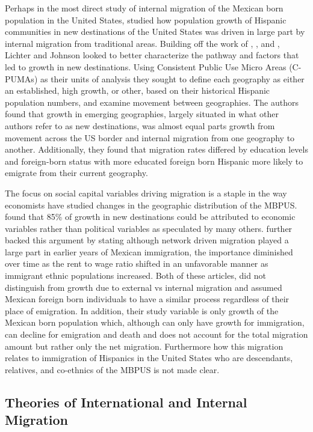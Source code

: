 \documentclass[fleqn,12pt]{olplainarticle}
\begin{document}
Perhaps in the most direct study of internal migration of the Mexican born population in the United States, \cite{Lichter2009} studied how population growth of Hispanic communities in new destinations of the United States was driven in large part by internal migration from traditional areas.
Building off the work of \cite{Hernandez-Leon2000}, \cite{Singer2004}, and \cite{Kandel2005}, Lichter and Johnson looked to better characterize the pathway and factors that led to growth in new destinations.
Using Consistent Public Use Micro Areas (C-PUMAs) as their units of analysis they sought to define each geography as either an established, high growth, or other, based on their historical Hispanic population numbers, and examine movement between geographies. 
The authors found that growth in emerging geographies, largely situated in what other authors refer to as new destinations, was almost equal parts growth from movement across the US border and internal migration from one geography to another.
Additionally, they found that migration rates differed by education levels and foreign-born status with more educated foreign born Hispanic more likely to emigrate from their current geography. 

The focus on social capital variables driving migration is a staple in the way economists have studied changes in the geographic distribution of the MBPUS.
\cite{Card2005} found that 85\% of growth in new destinations could be attributed to economic variables rather than political variables as speculated by many others.
\cite{Light2009} further backed this argument by stating although network driven migration played a large part in earlier years of Mexican immigration, the importance diminished over time as the rent to wage ratio shifted in an unfavorable manner as immigrant ethnic populations increased.
Both of these articles, did not distinguish from growth due to external vs internal migration and assumed Mexican foreign born individuals to have a similar process regardless of their place of emigration.
In addition, their study variable is only growth of the Mexican born population which, although can only have growth for immigration, can decline for emigration and death and does not account for the total migration amount but rather only the net migration.
Furthermore how this migration relates to immigration of Hispanics in the United States who are descendants, relatives, and co-ethnics of the MBPUS is not made clear.

\subsection*{Theories of International and Internal Migration}
\end{document}
